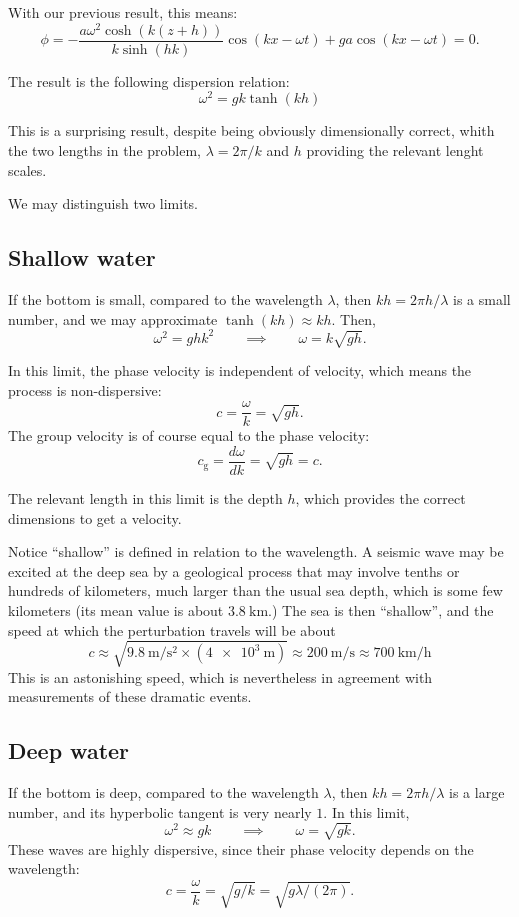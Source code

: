 With our previous result, this means:
\[
\phi =  - \frac{a \omega^2  \cosh(k(z+h)) }{ k \sinh(hk)  }  \cos(kx -\omega t ) +
g a \cos(kx -\omega t ) =0 .
\]

The result is the following dispersion relation:
\[
\omega^2= g k \tanh(k h)
\]

This is a surprising result, despite being obviously dimensionally
correct, whith the two lengths in the problem, $\lambda=2\pi/k$ and $h$
providing the relevant lenght scales.

We may distinguish two limits.

\subsection{Shallow water}
If the bottom is small, compared to the wavelength $\lambda$, then
$kh = 2\pi h / \lambda $ is a small number, and we may approximate
$\tanh(kh)\approx kh$. Then,
\[
\omega^2= g h  k^2 \qquad \implies \qquad \omega= k \sqrt{g h} .
\]

In this limit, the phase velocity is independent of velocity, which
means the process is non-dispersive:
\[
c =  \frac{\omega}{k} = \sqrt{ g h }  .
\]
The group velocity is of course equal to the phase velocity:
\[
c_\mathrm{g} =\frac{d\omega}{dk} = \sqrt{ g h } = c.
\]

The relevant length in this limit is the depth $h$, which provides the
correct dimensions to get a velocity.

Notice ``shallow'' is defined in relation to the wavelength. A seismic
wave may be excited at the deep sea by a geological process that may
involve tenths or hundreds of kilometers, much larger than the usual
sea depth, which is some few kilometers (its mean value is about
$\SI{3.8}{\kilo\meter}$.) The sea is then ``shallow'', and the speed
at which the perturbation travels will be about
\[
c \approx \sqrt{\SI{9.8}{\meter\per\second\squared} \times
  (\SI{4e3}{\meter}) } \approx \SI{200}{\meter\per\second}
  \approx \SI{700}{\kilo\meter\per\hour} 
\]
This is an astonishing speed, which is nevertheless in agreement with
measurements of these dramatic events.

\subsection{Deep water}

If the bottom is deep, compared to the wavelength $\lambda$, then $kh
= 2\pi h / \lambda $ is a large number, and its hyperbolic tangent is
very nearly $1$. In this limit,
\[
\omega^2 \approx g  k \qquad \implies \qquad \omega= \sqrt{g k} .
\]
These waves are highly dispersive, since their phase velocity depends
on the wavelength:
\[
c =  \frac{\omega}{k} = \sqrt{ g /k  } =  \sqrt{ g \lambda / (2\pi)  }  .
\]

